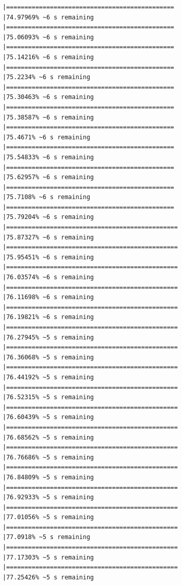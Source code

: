 \documentclass{article}\usepackage[]{graphicx}\usepackage[]{xcolor}
\makeatletter
\newenvironment{kframe}{%
 \def\at@end@of@kframe{}%
 \ifinner\ifhmode%
  \def\at@end@of@kframe{\end{minipage}}%
  \begin{minipage}{\columnwidth}%
 \fi\fi%
 \def\FrameCommand##1{\hskip\@totalleftmargin \hskip-\fboxsep
 \colorbox{shadecolor}{##1}\hskip-\fboxsep
     \hskip-\linewidth \hskip-\@totalleftmargin \hskip\columnwidth}%
 \MakeFramed {\advance\hsize-\width
   \@totalleftmargin\z@ \linewidth\hsize
   \@setminipage}}%
 {\par\unskip\endMakeFramed%
 \at@end@of@kframe}
\newenvironment{knitrout}{}{} %
\makeatother
\begin{document}
\begin{knitrout}
\begin{kframe}
\begin{verbatim}
|==============================================                |74.97969% ~6 s remaining  
|==============================================                |75.06093% ~6 s remaining  
|==============================================                |75.14216% ~6 s remaining  
|==============================================                |75.2234% ~6 s remaining   
|==============================================                |75.30463% ~6 s remaining  
|==============================================                |75.38587% ~6 s remaining  
|==============================================                |75.4671% ~6 s remaining   
|==============================================                |75.54833% ~6 s remaining  
|==============================================                |75.62957% ~6 s remaining  
|==============================================                |75.7108% ~6 s remaining   
|==============================================                |75.79204% ~6 s remaining  
|===============================================               |75.87327% ~6 s remaining  
|===============================================               |75.95451% ~6 s remaining  
|===============================================               |76.03574% ~6 s remaining  
|===============================================               |76.11698% ~6 s remaining  
|===============================================               |76.19821% ~6 s remaining  
|===============================================               |76.27945% ~5 s remaining  
|===============================================               |76.36068% ~5 s remaining  
|===============================================               |76.44192% ~5 s remaining  
|===============================================               |76.52315% ~5 s remaining  
|===============================================               |76.60439% ~5 s remaining  
|===============================================               |76.68562% ~5 s remaining  
|===============================================               |76.76686% ~5 s remaining  
|===============================================               |76.84809% ~5 s remaining  
|===============================================               |76.92933% ~5 s remaining  
|===============================================               |77.01056% ~5 s remaining  
|===============================================               |77.0918% ~5 s remaining   
|===============================================               |77.17303% ~5 s remaining  
|===============================================               |77.25426% ~5 s remaining  

\end{verbatim}
\end{kframe}
\end{knitrout}
\end{document}
